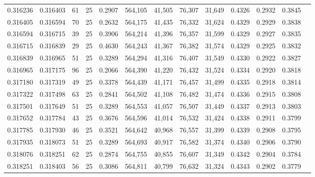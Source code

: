 \begin{tabular}{rrrrrrrrrrrrr}
0.316236 & 0.316403 &    61 &  25 &                                     0.2907 & 564,105 &  41,505 &  76,307 &  31,649 & 0.4326 & 0.2932 & 0.3845 \\
0.316405 & 0.316594 &    70 &  25 &                                     0.2632 & 564,175 &  41,435 &  76,332 &  31,624 & 0.4329 & 0.2929 & 0.3838 \\
0.316594 & 0.316715 &    39 &  25 &                                     0.3906 & 564,214 &  41,396 &  76,357 &  31,599 & 0.4329 & 0.2927 & 0.3835 \\
0.316715 & 0.316839 &    29 &  25 &                                     0.4630 & 564,243 &  41,367 &  76,382 &  31,574 & 0.4329 & 0.2925 & 0.3832 \\
0.316839 & 0.316965 &    51 &  25 &                                     0.3289 & 564,294 &  41,316 &  76,407 &  31,549 & 0.4330 & 0.2922 & 0.3827 \\
0.316965 & 0.317175 &    96 &  25 &                                     0.2066 & 564,390 &  41,220 &  76,432 &  31,524 & 0.4334 & 0.2920 & 0.3818 \\
0.317180 & 0.317319 &    49 &  25 &                                     0.3378 & 564,439 &  41,171 &  76,457 &  31,499 & 0.4335 & 0.2918 & 0.3814 \\
0.317322 & 0.317498 &    63 &  25 &                                     0.2841 & 564,502 &  41,108 &  76,482 &  31,474 & 0.4336 & 0.2915 & 0.3808 \\
0.317501 & 0.317649 &    51 &  25 &                                     0.3289 & 564,553 &  41,057 &  76,507 &  31,449 & 0.4337 & 0.2913 & 0.3803 \\
0.317652 & 0.317784 &    43 &  25 &                                     0.3676 & 564,596 &  41,014 &  76,532 &  31,424 & 0.4338 & 0.2911 & 0.3799 \\
0.317785 & 0.317930 &    46 &  25 &                                     0.3521 & 564,642 &  40,968 &  76,557 &  31,399 & 0.4339 & 0.2908 & 0.3795 \\
0.317935 & 0.318073 &    51 &  25 &                                     0.3289 & 564,693 &  40,917 &  76,582 &  31,374 & 0.4340 & 0.2906 & 0.3790 \\
0.318076 & 0.318251 &    62 &  25 &                                     0.2874 & 564,755 &  40,855 &  76,607 &  31,349 & 0.4342 & 0.2904 & 0.3784 \\
0.318251 & 0.318403 &    56 &  25 &                                     0.3086 & 564,811 &  40,799 &  76,632 &  31,324 & 0.4343 & 0.2902 & 0.3779 \\

\end{tabular}
